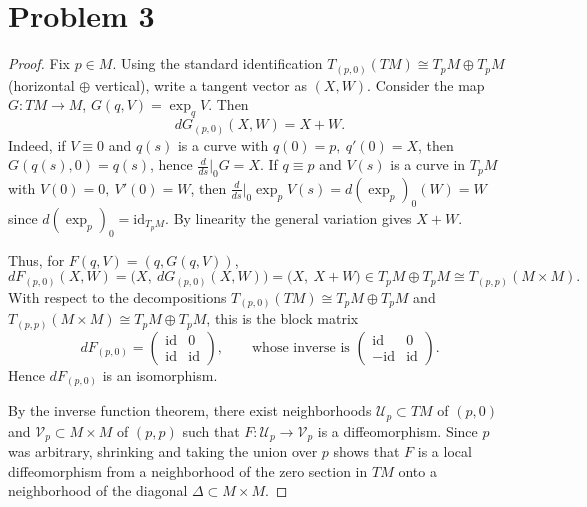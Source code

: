 \documentclass[12pt]{article}
\begin{document}
\section*{Problem 3}
\begin{proof}
Fix \(p\in M\). Using the standard identification
\(T_{(p,0)}(TM)\cong T_pM\oplus T_pM\) (horizontal \(\oplus\) vertical),
write a tangent vector as \((X,W)\).
Consider the map \(G:TM\to M\), \(G(q,V)=\exp_q V\).
Then
\[
dG_{(p,0)}(X,W)=X+W.
\]
Indeed, if \(V\equiv 0\) and \(q(s)\) is a curve with \(q(0)=p,\ q'(0)=X\),
then \(G(q(s),0)=q(s)\), hence \(\frac{d}{ds}\big|_{0}G=X\).
If \(q\equiv p\) and \(V(s)\) is a curve in \(T_pM\) with \(V(0)=0,\ V'(0)=W\),
then \(\frac{d}{ds}\big|_{0}\exp_p V(s)=d(\exp_p)_0(W)=W\) since
\(d(\exp_p)_0=\mathrm{id}_{T_pM}\).
By linearity the general variation gives \(X+W\).

Thus, for \(F(q,V)=(q,G(q,V))\),
\[
dF_{(p,0)}(X,W)=\bigl(X,\ dG_{(p,0)}(X,W)\bigr)=\bigl(X,\ X+W\bigr)
\in T_pM\oplus T_pM \cong T_{(p,p)}(M\times M).
\]
With respect to the decompositions \(T_{(p,0)}(TM)\cong T_pM\oplus T_pM\) and
\(T_{(p,p)}(M\times M)\cong T_pM\oplus T_pM\), this is the block matrix
\[
dF_{(p,0)}=
\begin{pmatrix}
\mathrm{id} & 0\\
\mathrm{id} & \mathrm{id}
\end{pmatrix},
\qquad
\text{whose inverse is }
\begin{pmatrix}
\mathrm{id} & 0\\
-\mathrm{id} & \mathrm{id}
\end{pmatrix}.
\]
Hence \(dF_{(p,0)}\) is an isomorphism.

By the inverse function theorem, there exist neighborhoods
\(\mathcal{U}_p\subset TM\) of \((p,0)\) and \(\mathcal{V}_p\subset M\times M\) of
\((p,p)\) such that \(F:\mathcal{U}_p\to\mathcal{V}_p\) is a diffeomorphism.
Since \(p\) was arbitrary, shrinking and taking the union over \(p\) shows
that \(F\) is a local diffeomorphism from a neighborhood of the zero section
in \(TM\) onto a neighborhood of the diagonal \(\Delta\subset M\times M\).

\end{proof}
\end{document}
